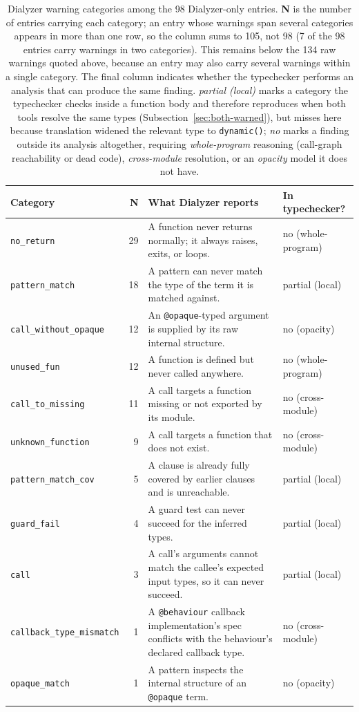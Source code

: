 \begin{table}[h]
\centering
\footnotesize
\begin{tabularx}{\textwidth}{@{}l r X l@{}}
\toprule
\textbf{Category} & \textbf{N} & \textbf{What Dialyzer reports} & \textbf{In typechecker?} \\
\midrule
\texttt{no\_return}            & 29 & A function never returns normally; it always raises, exits, or loops. & no (whole-program) \\
\texttt{pattern\_match}        & 18 & A pattern can never match the type of the term it is matched against. & partial (local) \\
\texttt{call\_without\_opaque} & 12 & An \texttt{@opaque}-typed argument is supplied by its raw internal structure. & no (opacity) \\
\texttt{unused\_fun}           & 12 & A function is defined but never called anywhere. & no (whole-program) \\
\texttt{call\_to\_missing}     & 11 & A call targets a function missing or not exported by its module. & no (cross-module) \\
\texttt{unknown\_function}     &  9 & A call targets a function that does not exist. & no (cross-module) \\
\texttt{pattern\_match\_cov}   &  5 & A clause is already fully covered by earlier clauses and is unreachable. & partial (local) \\
\texttt{guard\_fail}           &  4 & A guard test can never succeed for the inferred types. & partial (local) \\
\texttt{call}                  &  3 & A call's arguments cannot match the callee's expected input types, so it can never succeed. & partial (local) \\
\texttt{callback\_type\_mismatch} & 1 & A \texttt{@behaviour} callback implementation's spec conflicts with the behaviour's declared callback type. & no (cross-module) \\
\texttt{opaque\_match}         &  1 & A pattern inspects the internal structure of an \texttt{@opaque} term. & no (opacity) \\
\bottomrule
\end{tabularx}
\caption{Dialyzer warning categories among the 98 Dialyzer-only entries. \textbf{N} is the number of entries carrying each category; an entry whose warnings span several categories appears in more than one row, so the column sums to 105, not 98 (7 of the 98 entries carry warnings in two categories). This remains below the 134 raw warnings quoted above, because an entry may also carry several warnings within a single category. The final column indicates whether the typechecker performs an analysis that can produce the same finding. \emph{partial (local)} marks a category the typechecker checks inside a function body and therefore reproduces when both tools resolve the same types (Subsection~\ref{sec:both-warned}), but misses here because translation widened the relevant type to \texttt{dynamic()}; \emph{no} marks a finding outside its analysis altogether, requiring \emph{whole-program} reasoning (call-graph reachability or dead code), \emph{cross-module} resolution, or an \emph{opacity} model it does not have.}

\end{table}
